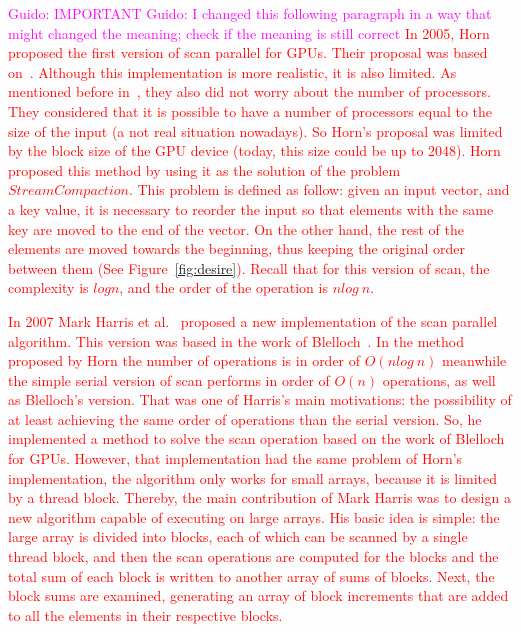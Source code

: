\documentclass[Ingles]{ic-tese-v1}
\newcommand{\guido}[1]{\noindent\textcolor{magenta}{Guido: {#1}}}
\newcommand{\ed}[1]{\noindent\textcolor{red}{ {#1}}}
\newcommand{\guido}[1]{}
\newcommand{\ed}[1]{}
\begin{document}
\guido{IMPORTANT}
\guido{I changed this following paragraph in a way that might changed the meaning; check if the meaning is still correct}
\ed{In 2005, Horn~\cite{GPUGems2} proposed the first version of scan parallel
for GPUs. Their proposal was based on~\cite{dataparallel}. Although this
implementation is more realistic, it is also  limited. As  mentioned before in~\cite{dataparallel}, 
they also did not worry about the number of processors.
They considered that it is possible to have a number of processors equal to the
size of the input (a not real situation nowadays).
So Horn's proposal was limited by the block size of the GPU device (today, this size could 
be up to 2048). Horn proposed this method by using it
as the solution of the problem $Stream Compaction$. This problem is defined
as follow: given an input vector, and a key value,  it is necessary to
reorder the input so that elements with the same key are moved to the end of
the vector. On the other hand, the rest of the elements are moved towards the beginning,
thus keeping the original order between them (See Figure~\ref{fig:desire}). Recall
that for this version of scan, the complexity is $log n$, and the order of
the operation is $n log\ n$.}

\ed{In 2007 Mark Harris et al.~\cite{harris2007parallel} proposed a new
implementation of the scan parallel algorithm. This version was based in the work
of Blelloch~\cite{ScanAsPrimitive}. In the method proposed by Horn the number
of operations is in order of $O(n log\ n)$ meanwhile the simple serial version
of scan performs in order of $O(n)$ operations, as well as Blelloch's version.
That was one of Harris's main motivations: the possibility of at least achieving
the same order of operations than the serial version. So, he implemented a
method to solve the scan operation based on the work of Blelloch for GPUs.
However, that implementation had the same problem of Horn's implementation, the
algorithm only works for small arrays, because it is limited by a thread
block. Thereby, the main contribution of Mark Harris was to design a new
algorithm capable of executing on large arrays. His basic idea is simple: 
the large array is divided into blocks, each of which
can be scanned by a single thread block, and then the scan operations are
computed for the blocks and the total sum of each block is written to another
array of sums of blocks. Next, the block sums are examined, generating an array
of block increments that are added to all the elements in their respective
blocks.}
\end{document}
